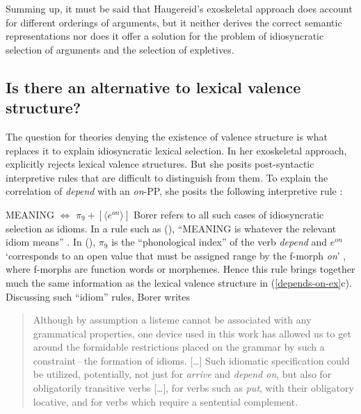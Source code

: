 \begin{exe}
\begin{xlist}[iv.]
\begin{exe}
\begin{xlist}[iv.]
Summing up, it must be said that Haugereid's exoskeletal approach does account for different
orderings of arguments, but it neither derives the correct semantic representations nor does it offer a
solution for the problem of idiosyncratic selection of arguments and the selection of expletives.

\subsection{Is there an alternative to lexical valence structure?}
\label{sec-borer}

The question for theories denying the existence of valence structure is what replaces it to explain
idiosyncratic lexical selection.  In her exoskeletal approach, \citet{Borer2005a-u} explicitly
rejects lexical valence structures.  But she posits post-syntactic interpretive rules that are
difficult to distinguish from them.  To explain the correlation of \emph{depend} with an
\emph{on}-PP, she posits the following interpretive rule \citep[Vol.\ II, p.\,29]{Borer2005a-u}:

\ea
MEANING $\Leftrightarrow$ $\pi_9 + [ \langle e^{on} \rangle ]$  
\z
Borer refers to all such cases of idiosyncratic selection as idioms.  In a rule such as (),
``MEANING is whatever the relevant idiom means'' \citep[Vol.\ II, p.\,27]{Borer2005a-u}.  In (),
$\pi_9$ is the ``phonological index'' of the verb \emph{depend} and $e^{on}$ `corresponds to an open
value that must be assigned range by the f-morph \emph{on}' \citep[Vol.\ II, p.\,29]{Borer2005a-u}, where f-morphs are function
words or morphemes.  Hence this rule brings together much the same information as the lexical
valence structure in (\ref{depends-on-ex}c).  Discussing such ``idiom'' rules, Borer writes  

\begin{quote}
Although by assumption a listeme cannot be associated with any grammatical properties, one device used in this work has allowed us to get around the formidable restrictions placed on the grammar by such a constraint\,--\,the formation of idioms.  [\ldots] 
Such idiomatic specification could be utilized, potentially, not just for \emph{arrive} and \emph{depend on}, but also for obligatorily transitive verbs [\ldots], for verbs such as \emph{put}, with their obligatory locative, and for verbs which require a sentential complement.


\end{quote}
\end{xlist}
\end{exe}
\end{xlist}
\end{exe}

